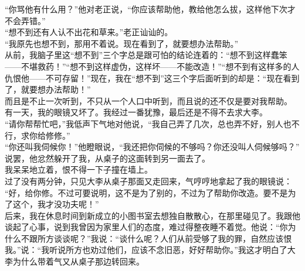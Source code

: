 “你骂他有什么用？”他对老正说，“你应该帮助他，教给他怎么拔，这样他下次才不会弄错。”\\

“想不到还有人认不出花和草来。”老正讪讪的。\\

“我原先也想不到，那用不着说。现在看到了，就要想办法帮助。”\\

从前，我脑子里这“想不到”三个字总是跟可怕的结论连着的：“想不到这样蠢笨——不堪救药！”“想不到这样虚伪，这样坏——不能改造！”“想不到有这样多的人仇恨他——不可存留！”现在，我在“想不到”这三个字后面听到的却是：“现在看到了，就要想办法帮助！”\\

而且是不止一次听到，不只从一个人口中听到，而且说的还不仅是要对我帮助。\\

有一天，我的眼镜又坏了。我经过一番犹豫，最后还是不得不去求大李。\\

“请你帮帮忙吧，”我低声下气地对他说，“我自己弄了几次，总也弄不好，别人也不行，求你给修修。”\\

“你还叫我伺候你！”他瞪眼说，“我还把你伺候的不够吗？你还没叫人伺候够吗？”\\

说罢，他忿然躲开了我，从桌子的这面转到另一面去了。\\

我呆呆地立着，恨不得一下子撞在墙上。\\

过了没有两分钟，只见大李从桌子那面又走回来，气哼哼地拿起了我的眼镜说：\\

“好，给你修。不过可要说明，这不是为了别的，不过为了帮助你改造。要不是为了这个，我才没功夫呢！”\\

后来，我在休息时间到新成立的小图书室去想独自散散心，在那里碰见了。我跟他谈起了心事，说到我曾因为家里人们的态度，难过得整夜睡不着觉。他说：“你为什么不跟所方谈谈呢？”我说：“谈什么呢？人们从前受够了我的罪，自然应该恨我。”说：“我听说所方也劝过他们，应该不念旧恶，好好帮助你。”我这才明白了大李为什么带着气又从桌子那边转回来。\\

